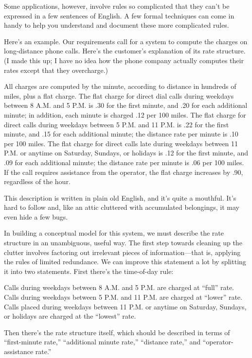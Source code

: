 Some applications, however, involve rules so complicated that they
can't be expressed in a few sentences of English. A few formal techniques
can come in handy to help you understand and document these more
complicated rules.

Here's an example. Our requirements call for a system to compute the
charges on long-distance phone calls. Here's the customer's
explanation of its rate structure. (I made this up; I have no idea how
the phone company actually computes their rates except that they
overcharge.)

\begin{tfquot}
All charges are computed by the minute, according to distance in
hundreds of miles, plus a flat charge. The flat charge for direct dial
calls during weekdays between 8 A.M. and 5 P.M. is .30 for the first
minute, and .20 for each additional minute; in addition, each minute
is charged .12 per 100 miles. The flat charge for direct calls during
weekdays between 5 P.M. and 11 P.M. is .22 for the first minute, and
.15 for each additional minute; the distance rate per minute is .10
per 100 miles. The flat charge for direct calls late during weekdays
between 11 P.M. or anytime on Saturday, Sundays, or holidays is .12
for the first minute, and .09 for each additional minute; the distance
rate per minute is .06 per 100 miles. If the call requires assistance
from the operator, the flat charge increases by .90, regardless of the hour.
\end{tfquot}
This description is written in plain old English, and it's quite a
mouthful.  It's hard to follow and, like an attic cluttered with
accumulated belongings, it may even hide a few bugs.

In building a conceptual model for this system, we must describe the
rate structure in an unambiguous, useful way. The first step towards
cleaning up the clutter involves factoring out irrelevant pieces of
information---that is, applying the rules of limited redundance. We
can improve this statement a lot by splitting it into two statements.
First there's the time-of-day rule:

\begin{tfquot}
Calls during weekdays between 8 A.M. and 5 P.M. are charged at ``full'' rate.
Calls during weekdays between 5 P.M. and 11 P.M. are charged at ``lower''
rate. Calls placed during weekdays between 11 P.M. or anytime on Saturday,
Sundays, or holidays are charged at the ``lowest'' rate.
\end{tfquot}
Then there's the rate structure itself, which should be described in
terms of ``first-minute rate,'' ``additional minute rate,'' ``distance
rate,'' and ``operator-assistance rate.''

